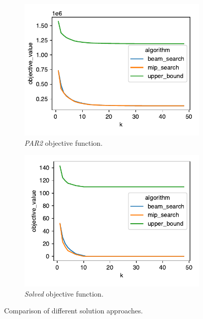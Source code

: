 \documentclass[conference]{IEEEtran}
\begin{document}
\begin{figure}[htb]
	\centering
	\begin{subfigure}{0.98\columnwidth}
		\centering
		\includegraphics[width=\columnwidth]{plots/objective-PAR2.pdf}
		\caption{\emph{PAR2} objective function.}
		\label{fig:objective-PAR2}
	\end{subfigure}
	\hfill
	\begin{subfigure}{0.98\columnwidth}
		\centering
		\includegraphics[width=\columnwidth]{plots/objective-solved.pdf}
		\caption{\emph{Solved} objective function.}
		\label{fig:objective-solved}
	\end{subfigure}
	\caption{Comparison of different solution approaches.}
	\label{fig:objective}
\end{figure}
\end{document}
